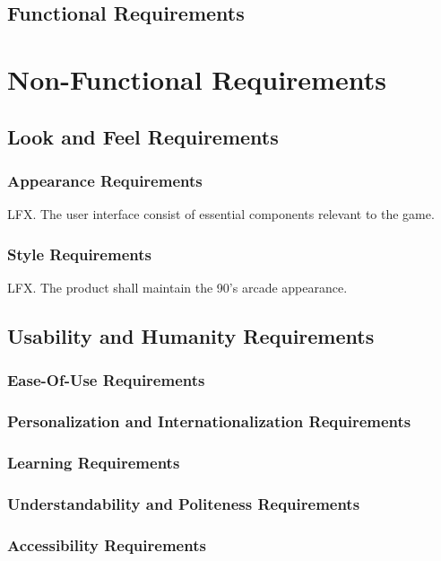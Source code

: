 \documentclass{article}
\begin{document}
\subsection{Functional Requirements}






\section{Non-Functional Requirements}
    \subsection{Look and Feel Requirements}
        \subsubsection{Appearance Requirements}
        LFX. The user interface consist of essential components relevant to the game.\\
   
        
	\subsubsection{Style Requirements} 
        LFX. The product shall maintain the 90's arcade appearance.\\

\subsection{Usability and Humanity Requirements}
\subsubsection{Ease-Of-Use Requirements}
\subsubsection{Personalization and Internationalization Requirements}
\subsubsection{Learning Requirements}
\subsubsection{Understandability and Politeness Requirements}
\subsubsection{Accessibility Requirements}
\end{document}
